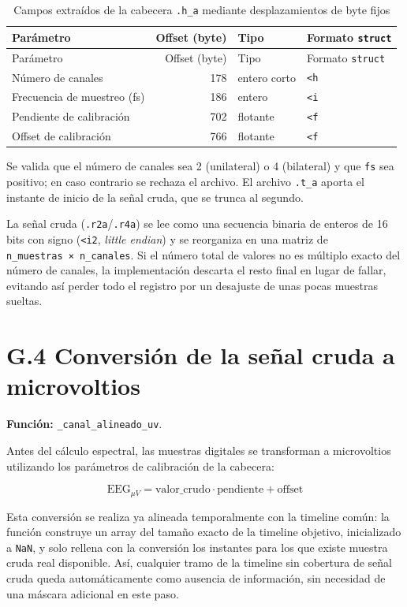 \documentclass[
  spanish,
  a4paper,
  12pt,
  twoside]{memoir}
\begin{document}
\begin{longtable}[]{@{}lrll@{}}
\caption{Campos extraídos de la cabecera \protect\texttt{.h\_a} mediante
desplazamientos de byte fijos}\label{tbl-header-offsets}\tabularnewline
\toprule\noalign{}
Parámetro & Offset (byte) & Tipo & Formato \texttt{struct} \\
\midrule\noalign{}
\endfirsthead
\toprule\noalign{}
Parámetro & Offset (byte) & Tipo & Formato \texttt{struct} \\
\midrule\noalign{}
\endhead
\bottomrule\noalign{}
\endlastfoot
Número de canales & 178 & entero corto & \texttt{\textless{}h} \\
Frecuencia de muestreo (fs) & 186 & entero & \texttt{\textless{}i} \\
Pendiente de calibración & 702 & flotante & \texttt{\textless{}f} \\
Offset de calibración & 766 & flotante & \texttt{\textless{}f} \\
\end{longtable}

Se valida que el número de canales sea 2 (unilateral) o 4 (bilateral) y
que \texttt{fs} sea positivo; en caso contrario se rechaza el archivo.
El archivo \texttt{.t\_a} aporta el instante de inicio de la señal
cruda, que se trunca al segundo.

La señal cruda (\texttt{.r2a}/\texttt{.r4a}) se lee como una secuencia
binaria de enteros de 16 bits con signo (\texttt{\textless{}i2},
\emph{little endian}) y se reorganiza en una matriz de
\texttt{n\_muestras\ ×\ n\_canales}. Si el número total de valores no es
múltiplo exacto del número de canales, la implementación descarta el
resto final en lugar de fallar, evitando así perder todo el registro por
un desajuste de unas pocas muestras sueltas.

\chapter{G.4 Conversión de la señal cruda a
microvoltios}\label{g.4-conversiuxf3n-de-la-seuxf1al-cruda-a-microvoltios}

\textbf{Función:} \texttt{\_canal\_alineado\_uv}.

Antes del cálculo espectral, las muestras digitales se transforman a
microvoltios utilizando los parámetros de calibración de la cabecera:

\[\text{EEG}_{\mu V} = \text{valor\_crudo} \cdot \text{pendiente} + \text{offset}\]

Esta conversión se realiza ya alineada temporalmente con la timeline
común: la función construye un array del tamaño exacto de la timeline
objetivo, inicializado a \texttt{NaN}, y solo rellena con la conversión
los instantes para los que existe muestra cruda real disponible. Así,
cualquier tramo de la timeline sin cobertura de señal cruda queda
automáticamente como ausencia de información, sin necesidad de una
máscara adicional en este paso.
\end{document}
